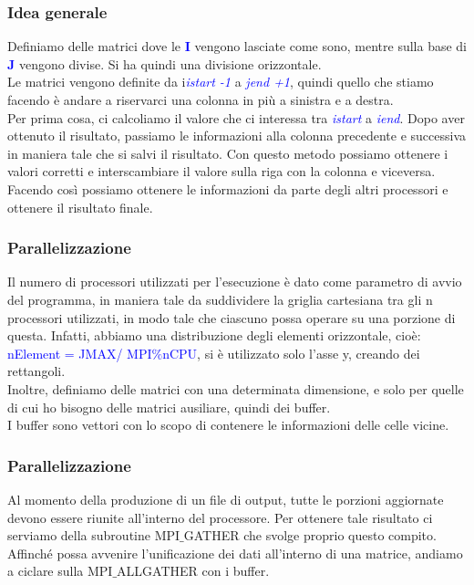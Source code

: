 \documentclass{beamer}
\begin{document}
\begin{frame}
	\frametitle{Idea generale}
	
	Definiamo delle matrici dove le \textcolor{blue}{\textbf{I}} vengono lasciate come sono, mentre sulla base di \textcolor{blue}{\textbf{J}} vengono divise. Si ha quindi una divisione orizzontale.\\
	Le matrici vengono definite  da i\textcolor{blue}{\emph{istart -1}} a \textcolor{blue}{\emph{jend +1}}, quindi quello che stiamo facendo è andare a riservarci una colonna in più a sinistra e a destra.\\
	Per prima cosa, ci calcoliamo il valore che ci interessa tra \textcolor{blue}{\emph{istart}} a \textcolor{blue}{\emph{iend}}.
	Dopo aver ottenuto il risultato, passiamo le informazioni alla colonna precedente e successiva in maniera tale che si salvi il risultato.
	Con questo metodo possiamo ottenere i valori corretti e interscambiare il valore sulla riga con la colonna e viceversa.
	Facendo così possiamo ottenere le informazioni da parte degli altri processori e ottenere il risultato finale.
	 
	
\end{frame}
\begin{frame}
	\frametitle{Parallelizzazione}
	Il numero di processori utilizzati per l'esecuzione è dato come parametro di avvio del programma, in maniera tale da suddividere la griglia cartesiana tra gli n processori utilizzati, in modo tale che ciascuno possa operare su una porzione di questa.
	Infatti, abbiamo una distribuzione degli elementi orizzontale, cioè: \textcolor{blue}{nElement = JMAX/ MPI$\%$nCPU}, si è utilizzato solo l'asse y, creando dei rettangoli.\\
	
	Inoltre, definiamo delle matrici con una determinata dimensione, e solo per quelle di cui ho bisogno delle matrici ausiliare, quindi dei buffer. \\
	I buffer sono vettori con lo scopo di contenere le informazioni delle celle vicine.
	
\end{frame}
\begin{frame}
	\frametitle{Parallelizzazione}
	Al momento della produzione di un file di output, tutte le porzioni aggiornate devono essere riunite all'interno del processore.
	Per ottenere tale risultato ci serviamo della subroutine MPI$\_$GATHER che svolge proprio questo compito. \\
	
	Affinché possa avvenire l'unificazione dei dati all'interno di una matrice, andiamo a ciclare sulla MPI$\_$ALLGATHER con i buffer.
\end{frame}
\end{document}
